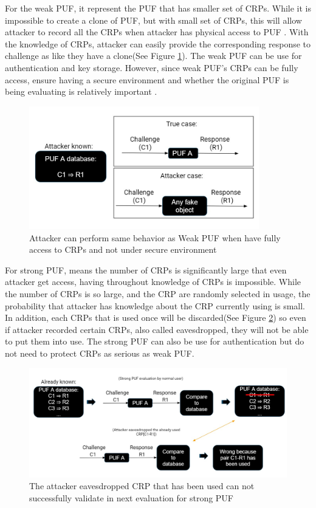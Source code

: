 For the weak PUF, it represent the PUF that has smaller set of CRPs. While it is impossible to 
create a clone of PUF, but with small set of CRPs, this will allow attacker to record all the CRPs when attacker has physical access to PUF \cite{Reference1}. With the knowledge of CRPs, attacker can easily provide the corresponding
response to challenge as like they have a clone(See Figure \ref{fig:figure2}). The weak PUF can be use for authentication and key storage. However, since weak PUF's CRPs can be fully access, ensure having a secure environment and whether the original PUF is being evaluating is relatively important \cite{Reference1}.
\begin{figure}[ht]
    \centering
    \includegraphics[width=10cm]{figures/figure2.jpg}
    \caption{Attacker can perform same behavior as Weak PUF when have fully access to CRPs and not under secure environment}
    \label{fig:figure2}
    \end{figure}

For strong PUF, means the number of CRPs is significantly large that even attacker get access, having throughout knowledge of CRPs is impossible. While the number of CRPs is so large,
and the CRP are randomly selected in usage, the probability that attacker has knowledge about the CRP currently using is small. In addition, each CRPs that is used once will 
be discarded(See Figure \ref{fig:figure3}) so even if attacker recorded certain CRPs, also called eavesdropped, they will not be able to put them into use. The strong PUF can also be use for authentication but do not need to protect CRPs
as serious as weak PUF.

\begin{figure}[ht]
    \centering
    \includegraphics[width=15cm]{figures/figure3.jpg}
    \caption{The attacker eavesdropped CRP that has been used can not successfully validate in next evaluation for strong PUF}
    \label{fig:figure3}
    \end{figure}

